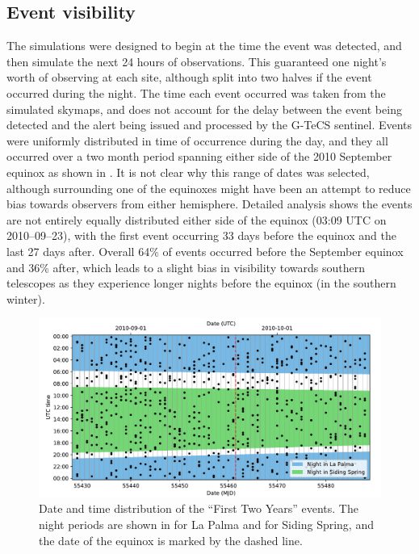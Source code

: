 \subsection{Event visibility}
\label{sec:gw_visability}
\begin{colsection}

The simulations were designed to begin at the time the event was detected, and then simulate the next 24 hours of observations. This guaranteed one night's worth of observing at each site, although split into two halves if the event occurred during the night. The time each event occurred was taken from the simulated skymaps, and does not account for the delay between the event being detected and the alert being issued and processed by the G-TeCS sentinel. Events were uniformly distributed in time of occurrence during the day, and they all occurred over a two month period spanning either side of the 2010 September equinox as shown in . It is not clear why this range of dates was selected, although surrounding one of the equinoxes might have been an attempt to reduce bias towards observers from either hemisphere. Detailed analysis shows the events are not entirely equally distributed either side of the equinox (03:09 UTC on 2010--09--23), with the first event occurring 33 days before the equinox and the last 27 days after. Overall 64\% of events occurred before the September equinox and 36\% after, which leads to a slight bias in visibility towards southern telescopes as they experience longer nights before the equinox (in the southern winter).

\begin{figure}[t]
    \begin{center}
        \includegraphics[width=\linewidth]{images/f2y_times.pdf}
    \end{center}
    \caption[Date and time distribution of events in the First Two Years sample]{
        Date and time distribution of the ``First Two Years'' events. The night periods are shown in  for La Palma and  for Siding Spring, and the date of the equinox is marked by the  dashed line.
    }\label{fig:f2y_times}
\end{figure}


\end{colsection}
